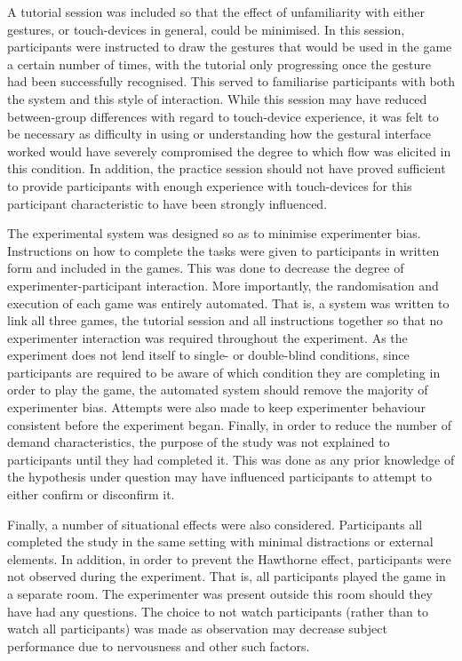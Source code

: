 A tutorial session was included so that the effect of unfamiliarity with either gestures, or touch-devices in general, could be minimised. In this session, participants were instructed to draw the gestures that would be used in the game a certain number of times, with the tutorial only progressing once the gesture had been successfully recognised. This served to familiarise participants with both the system and this style of interaction. While this session may have reduced between-group differences with regard to touch-device experience, it was felt to be necessary as difficulty in using or understanding how the gestural interface worked would have severely compromised the degree to which flow was elicited in this condition. In addition, the practice session should not have proved sufficient to provide participants with enough experience with touch-devices for this participant characteristic to have been strongly influenced.

The experimental system was designed so as to minimise experimenter bias. Instructions on how to complete the tasks were given to participants in written form and included in the games. This was done to decrease the degree of experimenter-participant interaction. More importantly, the randomisation and execution of each game was entirely automated. That is, a system was written to link all three games, the tutorial session and all instructions together so that no experimenter interaction was required throughout the experiment. As the experiment does not lend itself to single- or double-blind conditions, since participants are required to be aware of which condition they are completing in order to play the game, the automated system should remove the majority of experimenter bias. Attempts were also made to keep experimenter behaviour consistent before the experiment began. Finally, in order to reduce the number of demand characteristics, the purpose of the study was not explained to participants until they had completed it. This was done as any prior knowledge of the hypothesis under question may have influenced participants to attempt to either confirm or disconfirm it.

Finally, a number of situational effects were also considered. Participants all completed the study in the same setting with minimal distractions or external elements. In addition, in order to prevent the Hawthorne effect, participants were not observed during the experiment. That is, all participants played the game in a separate room. The experimenter was present outside this room should they have had any questions. The choice to not watch participants (rather than to watch all participants) was made  as observation may decrease subject performance due to nervousness and other such factors.

